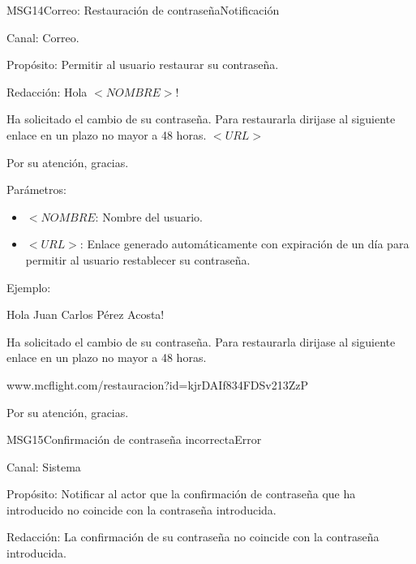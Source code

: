 \begin{mensaje}{MSG14}{Correo: Restauración de contraseña}{Notificación}
	\item[Canal:] Correo.
	\item[Propósito:] Permitir al usuario restaurar su contraseña.
	\item[Redacción:] \cdtEmpty
	Hola $<NOMBRE>$!
	
	Ha solicitado el cambio de su contraseña. Para restaurarla dirijase al siguiente enlace en un plazo no mayor a 48 horas.
	$<URL>$
	
	Por su atención, gracias.
	\item[Parámetros:] \cdtEmpty 	
	\begin{itemize}
		\item $<NOMBRE$: Nombre del usuario.
		\item $<URL>$: Enlace generado automáticamente con expiración de un día para permitir al usuario restablecer su contraseña.
	\end{itemize}
	\item[Ejemplo:] \cdtEmpty
	
	Hola Juan Carlos Pérez Acosta!
	
	Ha solicitado el cambio de su contraseña. Para restaurarla dirijase al siguiente enlace en un plazo no mayor a 48 horas.
	
	www.mcflight.com/restauracion?id=kjrDAIf834FDSv213ZzP
	
	Por su atención, gracias.
	
\end{mensaje}

\begin{mensaje}{MSG15}{Confirmación de contraseña incorrecta}{Error}
	\item[Canal:] Sistema
	\item[Propósito:] Notificar al actor que la confirmación de contraseña que ha introducido no coincide con la contraseña introducida.
	\item[Redacción:] La confirmación de su contraseña no coincide con la contraseña introducida.
\end{mensaje}